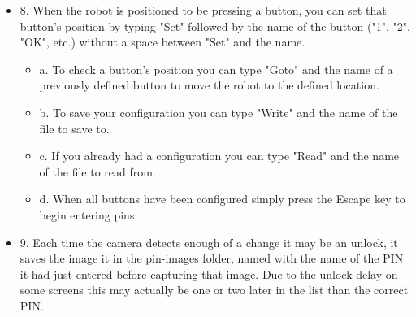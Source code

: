 \documentclass[a4paper,12pt]{letter}
\begin{document}
\begin{itemize}
\begin{itemize}
\end{itemize}
\item 8. When the robot is positioned to be pressing a button, you can set that button's position by typing "Set" followed by the name of the button ("1", "2", "OK", etc.) without a space between "Set" and the name.
\begin{itemize}
\item a. To check a button's position you can type "Goto" and the name of a previously defined button to move the robot to the defined location.
\item b. To save your configuration you can type "Write" and the name of the file to save to.
\item c. If you already had a configuration you can type "Read" and the name of the file to read from.
\item d. When all buttons have been configured simply press the Escape key to begin entering pins.
\end{itemize}
\item 9. Each time the camera detects enough of a change it may be an unlock, it saves the image it in the pin-images folder, named with the name of the PIN it had just entered before capturing that image. Due to the unlock delay on some screens this may actually be one or two later in the list than the correct PIN.
\end{itemize}
\end{document}
